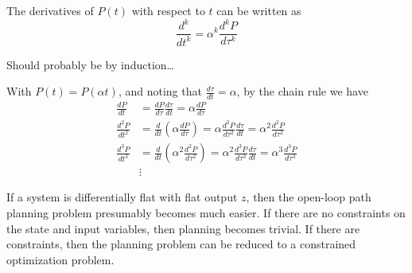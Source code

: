 \begin{theorem}
	The derivatives of $P(t)$ with respect to $t$ can be written as
	\begin{equation}
		\frac{d^{k}} {dt^k}  = \alpha^k \frac{d^k P}{d\tau^k}
	\end{equation}
\end{theorem}
\proof
Should probably be by induction\dots

With $P(t) = P(\alpha t)$, and noting that $\frac{d\tau}{dt} = \alpha$, by the chain rule we have
\begin{align}
\frac{dP}{dt} &= \frac{dP}{d\tau}\frac{d\tau}{dt} = \alpha \frac{dP}{d\tau} \\
\frac{d^2P}{dt^2} &= \frac{d}{dt} \left( \alpha \frac{dP}{d\tau} \right) = \alpha \frac{d^2P}{d\tau^2}\frac{d\tau}{dt} = \alpha^2 \frac{d^2P}{d\tau^2}  \\
\frac{d^3P}{dt^3} &= \frac{d}{dt} \left( \alpha^2 \frac{d^2P}{d\tau^2} \right) = \alpha^2 \frac{d^3P}{d\tau^3}\frac{d\tau}{dt} = \alpha^3 \frac{d^3P}{d\tau^3} \\
&\vdots
\end{align}
\endproof






If a system is differentially flat with flat output $z$, then the open-loop path planning problem presumably becomes much easier.  If there are no constraints on the state and input variables, then planning becomes trivial.  If there are constraints, then the planning problem can be reduced to a constrained optimization problem.

